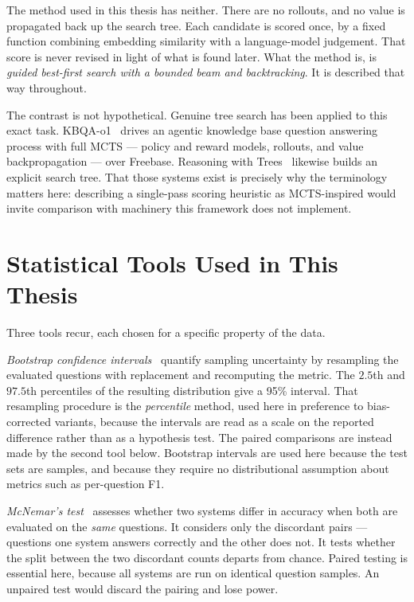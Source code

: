 The method used in this thesis has neither. There are no rollouts, and no value
is propagated back up the search tree. Each candidate is scored once, by a
fixed function combining embedding similarity with a language-model judgement.
That score is never revised in light of what is found later. What the method
is, is \emph{guided best-first search with a bounded beam and backtracking}. It
is described that way throughout.

The contrast is not hypothetical. Genuine tree search has been applied to this
exact task. KBQA-o1~\cite{luo2025kbqao1} drives an agentic knowledge base
question answering process with full MCTS --- policy and reward models,
rollouts, and value backpropagation --- over Freebase. Reasoning with
Trees~\cite{shen2025reasoning} likewise builds an explicit search tree. That
those systems exist is precisely why the terminology matters here: describing a
single-pass scoring heuristic as MCTS-inspired would invite comparison with
machinery this framework does not implement.

\section{Statistical Tools Used in This Thesis}\label{sec:stats}

Three tools recur, each chosen for a specific property of the
data.

\emph{Bootstrap confidence intervals}~\cite{efron1979bootstrap} quantify
sampling uncertainty by resampling the evaluated questions with replacement and
recomputing the metric. The $2.5$th and $97.5$th percentiles of the resulting
distribution give a 95\% interval. That resampling procedure is the
\emph{percentile} method, used
here in preference to bias-corrected variants, because the intervals are read
as a scale on the reported difference rather than as a hypothesis test. The
paired comparisons are instead made by the second tool below. Bootstrap
intervals are used here because the test sets are samples, and because they
require no distributional assumption about metrics such as per-question F1.

\emph{McNemar's test}~\cite{mcnemar1947note} assesses whether two systems differ
in accuracy when both are evaluated on the \emph{same} questions. It considers
only the discordant pairs --- questions one system answers correctly and the
other does not. It tests whether the split between the two discordant counts
departs from chance. Paired testing is essential here, because all systems are
run on identical question samples. An unpaired test would discard the pairing
and lose power.


